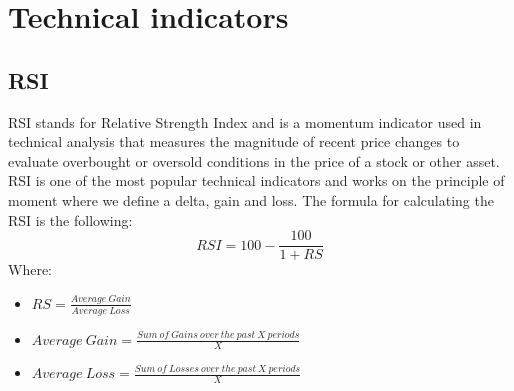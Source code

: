 \documentclass{imc-inf}
\begin{document}
	\section{Technical indicators}
	\subsection{RSI}
	RSI stands for Relative Strength Index and is a momentum indicator used in technical analysis that measures the magnitude of recent price changes to
	evaluate overbought or oversold conditions in the price of a stock or other asset. RSI is one of the most popular technical indicators
	and works on the principle of moment where we define a delta, gain and loss. The formula for calculating the RSI is the following:
	\begin{equation}
		RSI = 100 - \frac{100}{1 + RS}
	\end{equation}
	Where:
	\begin{itemize}
		\item $RS = \frac{Average\ Gain}{Average\ Loss}$
		\item $Average\ Gain = \frac{Sum\ of\ Gains\ over\ the\ past\ X\ periods}{X}$
		\item $Average\ Loss = \frac{Sum\ of\ Losses\ over\ the\ past\ X\ periods}{X}$
	\end{itemize}
	
\end{document}
